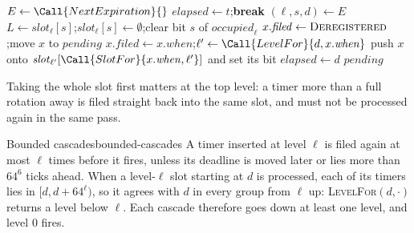 \begin{algorithm}[htbp]
    \caption{Advancing the wheel to tick $t$.}
    \label{alg:tw-advance}
    \begin{algorithmic}[1]
            \Loop
                \State $E \gets \Call{NextExpiration}{}$
                    \State $\mathit{elapsed} \gets t$;\enspace \textbf{break}
                \EndIf
                \State $(\ell, s, d) \gets E$
                \State $L \gets \mathit{slot}_\ell[s]$;\enspace $\mathit{slot}_\ell[s] \gets \emptyset$;\enspace clear bit $s$ of $\mathit{occupied}_\ell$
                        \State $x.\mathit{filed} \gets \textsc{Deregistered}$;\enspace move $x$ to $\mathit{pending}$
                    \Else
                        \State $x.\mathit{filed} \gets x.\mathit{when}$;\enspace $\ell' \gets \Call{LevelFor}{d, x.\mathit{when}}$
                        \State push $x$ onto $\mathit{slot}_{\ell'}[\Call{SlotFor}{x.\mathit{when}, \ell'}]$ and set its bit
                    \EndIf
                \EndFor
                \State $\mathit{elapsed} \gets d$
            \EndLoop
            \State \Return $\mathit{pending}$
        \EndFunction
    \end{algorithmic}
\end{algorithm}

Taking the whole slot first matters at the top level: a timer more than a full rotation away is filed straight back into the same slot, and must not be processed again in the same pass.

\begin{corollary}{Bounded cascades}{bounded-cascades}
    A timer inserted at level $\ell$ is filed again at most $\ell$ times before it fires, unless its deadline is moved later or lies more than $64^6$ ticks ahead.
    \why When a level-$\ell$ slot starting at $d$ is processed, each of its timers lies in $[d, d + 64^{\ell})$, so it agrees with $d$ in every group from $\ell$ up: \textsc{LevelFor}$(d, \cdot)$ returns a level below $\ell$. Each cascade therefore goes down at least one level, and level 0 fires.
\end{corollary}

